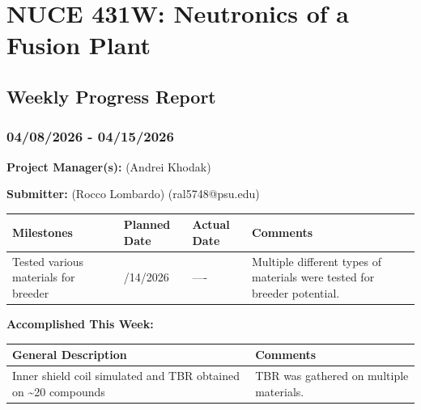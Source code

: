 \documentclass{article}
\begin{document}
{\centering \section*{NUCE 431W: Neutronics of a Fusion Plant}

\subsection*{Weekly Progress Report}

\subsubsection*{04/08/2026 - 04/15/2026}}


\hrulefill

\bigskip

\textbf{Project Manager(s):} (Andrei Khodak) 

\bigskip

\textbf{Submitter:} (Rocco Lombardo) (ral5748@psu.edu)

\bigskip

\renewcommand{\arraystretch}{1.5}
\begin{table}[H]
    \centering
    \begin{tabularx}{0.95\textwidth} { 
        | >{\centering\arraybackslash}X 
        | >{\centering\arraybackslash}X 
        | >{\centering\arraybackslash}X
        | >{\centering\arraybackslash}X | }

    \hline
    \textbf{Milestones} & \textbf{Planned Date} & \textbf{Actual Date} & \textbf{Comments} \\
    \hline
    Tested various materials for breeder  & 04/14/2026  & ---- & Multiple different types of materials were tested for breeder potential.    \\
    \hline
    \end{tabularx}
\end{table}

\bigskip

\textbf{Accomplished This Week: }

\renewcommand{\arraystretch}{1.5}
\begin{table}[H]
    \centering
    \begin{tabularx}{0.95\textwidth} { 
        | >{\centering\arraybackslash}X
        | >{\centering\arraybackslash}X | }

    \hline
    \textbf{General Description} & \textbf{Comments} \\
    \hline
    Inner shield coil simulated and TBR obtained on \sim 20 compounds  & TBR was gathered on multiple materials. \\
    \hline
    \end{tabularx}
\end{table}
\end{document}
